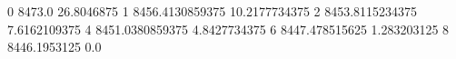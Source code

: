 0 8473.0 26.8046875
1 8456.4130859375 10.2177734375
2 8453.8115234375 7.6162109375
4 8451.0380859375 4.8427734375
6 8447.478515625 1.283203125
8 8446.1953125 0.0
